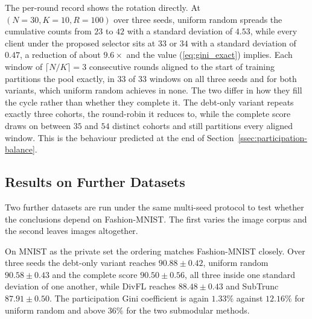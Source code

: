 \documentclass[journal]{IEEEtran}
\newcommand{\rev}[1]{#1}
\begin{document}
\rev{The per-round record shows the rotation directly. At $(N = 30, K = 10, R = 100)$ over three seeds, uniform random spreads the cumulative counts from $23$ to $42$ with a standard deviation of $4.53$, while every client under the proposed selector sits at $33$ or $34$ with a standard deviation of $0.47$, a reduction of about $9.6\times$ and the value (\ref{eq:gini_exact}) implies. Each window of $\lceil N/K \rceil = 3$ consecutive rounds aligned to the start of training partitions the pool exactly, in $33$ of $33$ windows on all three seeds and for both variants, which uniform random achieves in none. The two differ in how they fill the cycle rather than whether they complete it. The debt-only variant repeats exactly three cohorts, the round-robin it reduces to, while the complete score draws on between $35$ and $54$ distinct cohorts and still partitions every aligned window. This is the behaviour predicted at the end of Section~\ref{ssec:participation-balance}.}

\subsection{Results on Further Datasets}
\label{ssec:exp-cross-dataset}

\rev{Two further datasets are run under the same multi-seed protocol to test whether the conclusions depend on Fashion-MNIST. The first varies the image corpus and the second leaves images altogether.}

\rev{On MNIST as the private set the ordering matches Fashion-MNIST closely. Over three seeds the debt-only variant reaches $90.88 \pm 0.42$, uniform random $90.58 \pm 0.43$ and the complete score $90.50 \pm 0.56$, all three inside one standard deviation of one another, while DivFL reaches $88.48 \pm 0.43$ and SubTrunc $87.91 \pm 0.50$. The participation Gini coefficient is again $1.33\%$ against $12.16\%$ for uniform random and above $36\%$ for the two submodular methods.}
\end{document}

